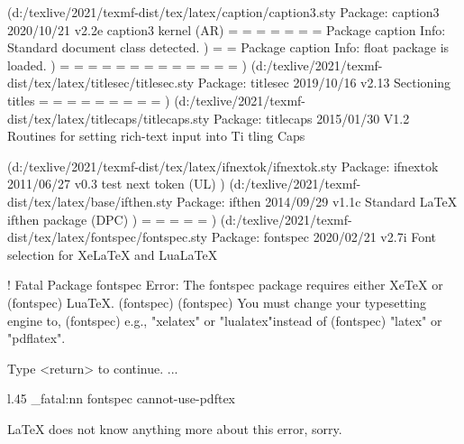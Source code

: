 (d:/texlive/2021/texmf-dist/tex/latex/caption/caption3.sty
Package: caption3 2020/10/21 v2.2e caption3 kernel (AR)
\captionmargin=
\captionmargin@=
\captionwidth=
\caption@tempdima=
\caption@indent=
\caption@parindent=
\caption@hangindent=
Package caption Info: Standard document class detected.
)
\c@caption@flags=
\c@continuedfloat=
Package caption Info: float package is loaded.
)
\c@KVtest=
\sf@farskip=
\sf@captopadj=
\sf@capskip=
\sf@nearskip=
\c@subfigure=
\c@subfigure@save=
\c@lofdepth=
\c@subtable=
\c@subtable@save=
\c@lotdepth=
\sf@top=
\sf@bottom=
)
(d:/texlive/2021/texmf-dist/tex/latex/titlesec/titlesec.sty
Package: titlesec 2019/10/16 v2.13 Sectioning titles
\ttl@box=
\beforetitleunit=
\aftertitleunit=
\ttl@plus=
\ttl@minus=
\ttl@toksa=
\titlewidth=
\titlewidthlast=
\titlewidthfirst=
)
(d:/texlive/2021/texmf-dist/tex/latex/titlecaps/titlecaps.sty
Package: titlecaps 2015/01/30 V1.2 Routines for setting rich-text input into Ti
tling Caps

(d:/texlive/2021/texmf-dist/tex/latex/ifnextok/ifnextok.sty
Package: ifnextok 2011/06/27 v0.3 test next token (UL)
)
(d:/texlive/2021/texmf-dist/tex/latex/base/ifthen.sty
Package: ifthen 2014/09/29 v1.1c Standard LaTeX ifthen package (DPC)
)
\c@lcword@index=
\c@word@count=
\c@lc@words=
\c@dia@count=
\c@arg@@@index=
)
(d:/texlive/2021/texmf-dist/tex/latex/fontspec/fontspec.sty
Package: fontspec 2020/02/21 v2.7i Font selection for XeLaTeX and LuaLaTeX


! Fatal Package fontspec Error: The fontspec package requires either XeTeX or
(fontspec)                      LuaTeX.
(fontspec)                      
(fontspec)                      You must change your typesetting engine to,
(fontspec)                      e.g., "xelatex" or "lualatex"instead of
(fontspec)                      "latex" or "pdflatex".

Type <return> to continue.
 ...                                              
                                                  
l.45 \msg_fatal:nn {fontspec} {cannot-use-pdftex}
                                                 

LaTeX does not know anything more about this error, sorry.

